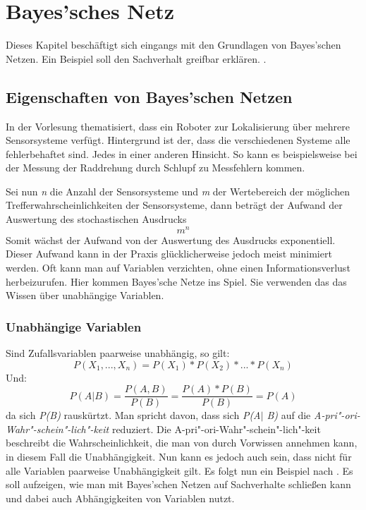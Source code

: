 \chapter{Bayes'sches Netz}
Dieses Kapitel beschäftigt sich eingangs mit den Grundlagen von Bayes'schen Netzen. Ein Beispiel soll den Sachverhalt greifbar erklären.
.
\section{Eigenschaften von Bayes'schen Netzen}
In der Vorlesung thematisiert, dass ein Roboter zur Lokalisierung über mehrere Sensorsysteme verfügt. Hintergrund ist der, dass die verschiedenen Systeme alle fehlerbehaftet sind. Jedes in einer anderen Hinsicht. So kann es beispielsweise bei der Messung der Raddrehung durch Schlupf zu Messfehlern kommen.

Sei nun \textit{n} die Anzahl der Sensorsysteme und \textit{m} der Wertebereich der möglichen Trefferwahrscheinlichkeiten der Sensorsysteme, dann beträgt der Aufwand der Auswertung des stochastischen Ausdrucks \[ m^n\] Somit wächst der Aufwand von der Auswertung des Ausdrucks exponentiell. Dieser Aufwand kann in der Praxis glücklicherweise jedoch meist minimiert werden. Oft kann man auf Variablen verzichten, ohne einen Informationsverlust herbeizurufen. Hier kommen Bayes'sche Netze ins Spiel. Sie verwenden das das Wissen über unabhängige Variablen. 
\subsection{Unabhängige Variablen}
Sind Zufallsvariablen paarweise unabhängig, so gilt: \[ P(X_1, ..., X_n) = P(X_1) * P(X_2) * ... * P(X_n)\] 
Und: \[ P(A\vert B) = \frac{P(A,B)}{P(B)} = \frac{P(A) * P(B)}{P(B)}  = P(A) \] da sich \textit{P(B)} rauskürtzt. Man spricht davon, dass sich \textit{P(A$\vert$ B)} auf die \textit{A-pri"-ori-Wahr"-schein"-lich"-keit} reduziert. Die A-pri"-ori-Wahr"-schein"-lich"-keit beschreibt die Wahrscheinlichkeit, die man von durch Vorwissen annehmen kann, in diesem Fall die Unabhängigkeit. Nun kann es jedoch auch sein, dass nicht für alle Variablen paarweise Unabhängigkeit gilt. Es folgt nun ein Beispiel nach \cite{Perl88}. Es soll aufzeigen, wie man mit Bayes'schen Netzen auf Sachverhalte schließen kann und dabei auch Abhängigkeiten von Variablen nutzt. 

